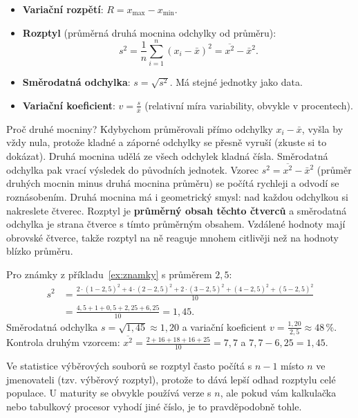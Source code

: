 \begin{definitionbox}
  \begin{itemize}
    \item \textbf{Variační rozpětí}: $R = x_{\max} - x_{\min}$.
    \item \textbf{Rozptyl} (průměrná druhá mocnina odchylky od průměru):
    \begin{equation*}
      s^2 = \frac{1}{n}\sum_{i=1}^{n}{(x_i - \bar{x})}^2 = \overline{x^2} - \bar{x}^2.
    \end{equation*}
    \item \textbf{Směrodatná odchylka}: $s = \sqrt{s^2}$. Má stejné jednotky jako data.
    \item \textbf{Variační koeficient}: $v = \frac{s}{\bar{x}}$ (relativní míra variability, obvykle v procentech).
  \end{itemize}
\end{definitionbox}

Proč druhé mocniny? Kdybychom průměrovali přímo odchylky $x_i - \bar{x}$, vyšla by vždy nula, protože kladné a záporné odchylky se přesně vyruší (zkuste si to dokázat). Druhá mocnina udělá ze všech odchylek kladná čísla. Směrodatná odchylka pak vrací výsledek do původních jednotek. Vzorec $s^2 = \overline{x^2} - \bar{x}^2$ (průměr druhých mocnin minus druhá mocnina průměru) se počítá rychleji a odvodí se roznásobením.
 Druhá mocnina má i geometrický smysl: nad každou odchylkou si nakreslete čtverec. Rozptyl je \textbf{průměrný obsah těchto čtverců} a směrodatná odchylka je strana čtverce s tímto průměrným obsahem. Vzdálené hodnoty mají obrovské čtverce, takže rozptyl na ně reaguje mnohem citlivěji než na hodnoty blízko průměru.

\begin{example}
  Pro známky z příkladu~\ref{ex:znamky} s průměrem $2{,}5$:
  \begin{align*}
    s^2 &= \frac{2\cdot{(1 - 2{,}5)}^2 + 4\cdot{(2 - 2{,}5)}^2 + 2\cdot{(3 - 2{,}5)}^2 + {(4 - 2{,}5)}^2 + {(5 - 2{,}5)}^2}{10}\\
    &= \frac{4{,}5 + 1 + 0{,}5 + 2{,}25 + 6{,}25}{10} = 1{,}45.
  \end{align*}
  Směrodatná odchylka $s = \sqrt{1{,}45}\approx 1{,}20$ a variační koeficient $v = \frac{1{,}20}{2{,}5}\approx 48\,\%$. Kontrola druhým vzorcem: $\overline{x^2} = \frac{2 + 16 + 18 + 16 + 25}{10} = 7{,}7$ a $7{,}7 - 6{,}25 = 1{,}45$.
\end{example}

\begin{note}
  Ve statistice výběrových souborů se rozptyl často počítá s $n - 1$ místo $n$ ve jmenovateli (tzv. výběrový rozptyl), protože to dává lepší odhad rozptylu celé populace. U maturity se obvykle používá verze s $n$, ale pokud vám kalkulačka nebo tabulkový procesor vyhodí jiné číslo, je to pravděpodobně tohle.
\end{note}

